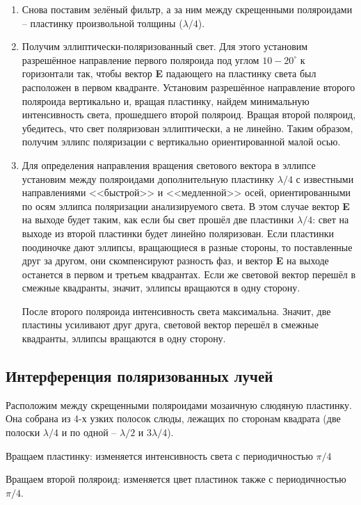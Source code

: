 	\begin{enumerate}
		\item  Снова поставим зелёный фильтр, а за ним между скрещенными поляроидами -- пластинку произвольной толщины ($\lambda/4$).
		
		\item Получим эллиптически-поляризованный свет. Для этого установим разрешённое направление первого поляроида под углом $10-20^{\circ}$ к горизонтали так, чтобы вектор \textbf{E} падающего на пластинку света был расположен в первом квадранте.
		Установим разрешённое направление второго поляроида вертикально и, вращая пластинку, найдем минимальную
		интенсивность света, прошедшего второй поляроид. Вращая второй поляроид, убедитесь, что свет поляризован эллиптически,
		а не линейно.
		Таким образом, получим эллипс поляризации с вертикально ориентированной малой осью.
		\item  Для определения направления вращения светового вектора в эллипсе
		установим между поляроидами дополнительную пластинку $\lambda/4$ с известными направлениями <<быстрой>> и <<медленной>> осей, ориентированными по осям эллипса поляризации анализируемого света.
		В этом случае вектор \textbf{E} на выходе будет таким, как если бы свет прошёл две пластинки $\lambda/4$: свет на выходе из второй пластинки будет линейно поляризован. Если пластинки поодиночке дают эллипсы, вращающиеся в разные стороны, то поставленные друг за другом, они скомпенсируют
		разность фаз, и вектор \textbf{E} на выходе останется в первом
		и третьем квадрантах. Если же световой вектор перешёл в смежные квадранты, значит, эллипсы вращаются в одну сторону. 
		
		После второго поляроида интенсивность света максимальна. Значит, две пластины усиливают друг друга, световой вектор перешёл в смежные квадранты, эллипсы вращаются в одну сторону.
		
	\end{enumerate}
	
	\subsection*{Интерференция поляризованных лучей}
	
	Расположим между скрещенными поляроидами мозаичную слюдяную пластинку. Она собрана из 4-х узких полосок слюды, лежащих по сторонам квадрата (две полоски $\lambda/4$ и по одной -- $\lambda/2$ и $3\lambda/4$).
	 
	Вращаем пластинку: изменяется интенсивность света с периодичностью $\pi/4$
	
	Вращаем второй поляроид: изменяется цвет пластинок также с периодичностью  $\pi/4$.

